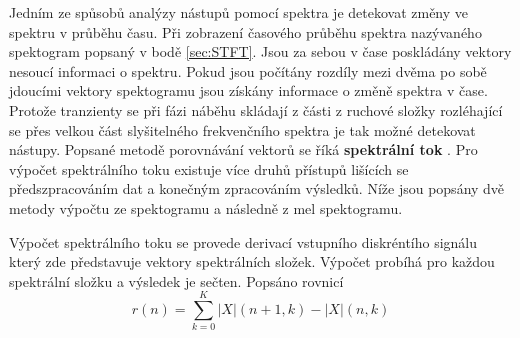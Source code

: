   Jedním ze spůsobů analýzy nástupů pomocí spektra je detekovat změny ve spektru v průběhu času. Při zobrazení časového průběhu spektra nazývaného spektogram popsaný v bodě \ref{sec:STFT}.
  Jsou za sebou v čase poskládány vektory nesoucí informaci o spektru.
  Pokud jsou počítány rozdíly mezi dvěma po sobě jdoucími vektory spektogramu jsou získány informace o změně spektra v čase.
  Protože tranzienty se při fázi náběhu skládají z části z ruchové složky rozléhající se přes velkou část slyšitelného frekvenčního spektra je tak možné detekovat nástupy.
  Popsané metodě porovnávání vektorů se říká \textbf{spektrální tok} \cite{fundamental_of_music_processing}.
  Pro výpočet spektrálního toku existuje více druhů přístupů lišících se předszpracováním dat a konečným zpracováním výsledků.
  Níže jsou popsány dvě metody výpočtu ze spektogramu a následně z mel spektogramu.

  Výpočet spektrálního toku se provede derivací vstupního diskréntího signálu který zde představuje vektory spektrálních složek. Výpočet probíhá pro každou spektrální složku a výsledek je sečten. Popsáno rovnicí 
\begin{equation}
  r(n) = \sum_{k = 0}^{K} |X|(n+1,k) - |X|(n,k)
\end{equation}

